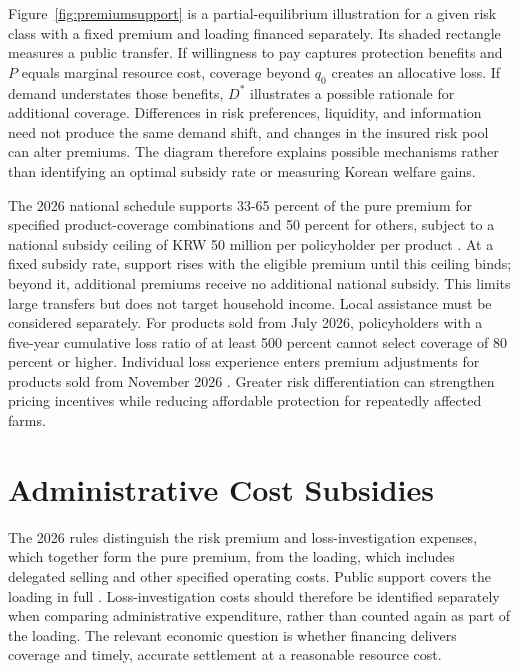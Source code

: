 Figure~\ref{fig:premiumsupport} is a partial-equilibrium illustration for a given risk class with a fixed premium and loading financed separately. Its shaded rectangle measures a public transfer. If willingness to pay captures protection benefits and $P$ equals marginal resource cost, coverage beyond $q_{0}$ creates an allocative loss. If demand understates those benefits, $D^{*}$ illustrates a possible rationale for additional coverage. Differences in risk preferences, liquidity, and information need not produce the same demand shift, and changes in the insured risk pool can alter premiums. The diagram therefore explains possible mechanisms rather than identifying an optimal subsidy rate or measuring Korean welfare gains.

The 2026 national schedule supports 33-65 percent of the pure premium for specified product-coverage combinations and 50 percent for others, subject to a national subsidy ceiling of KRW 50 million per policyholder per product \citep[p.~2]{mafra2026}. At a fixed subsidy rate, support rises with the eligible premium until this ceiling binds; beyond it, additional premiums receive no additional national subsidy. This limits large transfers but does not target household income. Local assistance must be considered separately. For products sold from July 2026, policyholders with a five-year cumulative loss ratio of at least 500 percent cannot select coverage of 80 percent or higher. Individual loss experience enters premium adjustments for products sold from November 2026 \citep{mafra2026}. Greater risk differentiation can strengthen pricing incentives while reducing affordable protection for repeatedly affected farms.

\section{Administrative Cost Subsidies}\label{sec:administrative}

The 2026 rules distinguish the risk premium and loss-investigation expenses, which together form the pure premium, from the loading, which includes delegated selling and other specified operating costs. Public support covers the loading in full \citep{mafra2026}. Loss-investigation costs should therefore be identified separately when comparing administrative expenditure, rather than counted again as part of the loading. The relevant economic question is whether financing delivers coverage and timely, accurate settlement at a reasonable resource cost.


